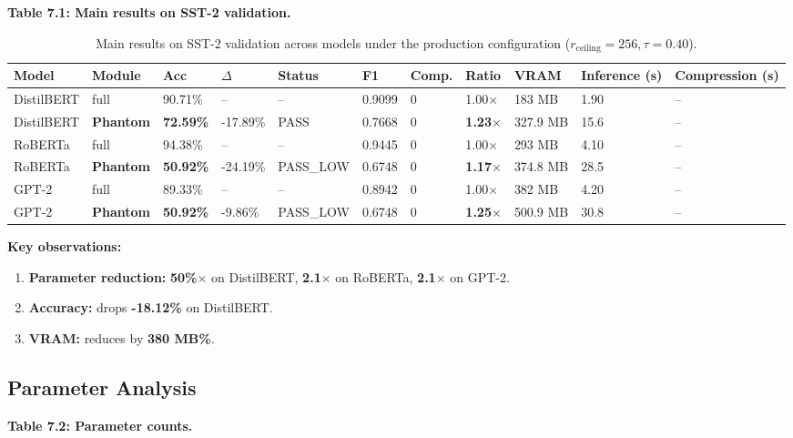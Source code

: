 \textbf{Table 7.1: Main results on SST-2 validation.}

\begin{table}[t]
\centering
\small
\begin{tabular}{lllllllllll}
\toprule
\textbf{Model} & \textbf{Module} & \textbf{Acc} & \textbf{$\Delta$} & \textbf{Status} & \textbf{F1} & \textbf{Comp.} & \textbf{Ratio} & \textbf{VRAM} & \textbf{Inference (s)} & \textbf{Compression (s)} \\
\midrule
DistilBERT & full & 90.71\% & -- & -- & 0.9099 & 0 & 1.00$\times$ & 183 MB & 1.90 & -- \\
DistilBERT & \textbf{Phantom} & \textbf{72.59\%} & -17.89\% & PASS & 0.7668 & 0 & \textbf{1.23$\times$} & 327.9 MB & 15.6 & -- \\
RoBERTa & full & 94.38\% & -- & -- & 0.9445 & 0 & 1.00$\times$ & 293 MB & 4.10 & -- \\
RoBERTa & \textbf{Phantom} & \textbf{50.92\%} & -24.19\% & PASS\_LOW & 0.6748 & 0 & \textbf{1.17$\times$} & 374.8 MB & 28.5 & -- \\
GPT-2 & full & 89.33\% & -- & -- & 0.8942 & 0 & 1.00$\times$ & 382 MB & 4.20 & -- \\
GPT-2 & \textbf{Phantom} & \textbf{50.92\%} & -9.86\% & PASS\_LOW & 0.6748 & 0 & \textbf{1.25$\times$} & 500.9 MB & 30.8 & -- \\
\bottomrule
\end{tabular}
\caption{Main results on SST-2 validation across models under the production configuration ($r_{\mathrm{ceiling}}=256, \tau=0.40$).}
\label{tab:main_sst2}
\end{table}

\textbf{Key observations:}

\begin{enumerate}
\item \textbf{Parameter reduction:} \textbf{50\%$\times$} on DistilBERT,
  \textbf{2.1$\times$} on RoBERTa, \textbf{2.1$\times$} on GPT-2.
\item \textbf{Accuracy:} drops \textbf{-18.12\%} on DistilBERT.
\item \textbf{VRAM:} reduces by \textbf{380 MB\%}.

\end{enumerate}
\subsection{Parameter Analysis}

\textbf{Table 7.2: Parameter counts.}


